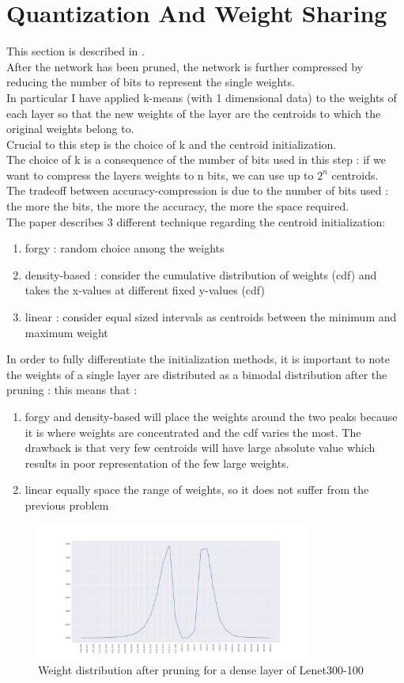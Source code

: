 \documentclass[journal]{vgtc}                %
\begin{document}
\section{Quantization And Weight Sharing}
This section is described in \cite{p2}.\\After the network has been pruned, the network is further compressed by reducing the number of bits to represent the single weights.\\In particular I have applied k-means (with 1 dimensional data) to the weights of each layer so that the new weights of the layer are the centroids to which the original weights belong to.\\Crucial to this step is the choice of k and the centroid initialization.\\The choice of k is a consequence of the number of bits used in this step : if we want to compress the layers weights to n bits, we can use up to $2^{n}$ centroids.\\The tradeoff between accuracy-compression is due to the number of bits used : the more the bits, the more the accuracy, the more the space required.\\The paper describes 3 different technique regarding the centroid initialization:
\begin{enumerate}
\item forgy : random choice among the weights 
\item density-based : consider the cumulative distribution of weights (cdf) and takes the x-values at different fixed y-values (cdf)
\item linear : consider equal sized intervals as centroids between the minimum and maximum weight
\end{enumerate}
In order to fully differentiate the initialization methods, it is important to note  the weights of a single layer are distributed as a bimodal distribution after the pruning : this means that :
\begin{enumerate}
\item forgy and density-based will place the weights around the two peaks because it is where weights are concentrated and the cdf varies the most. The drawback is that very few centroids will have large absolute value which results in poor representation of the few large weights.
\item linear equally space the range of weights, so it does not suffer from the previous problem
\end{enumerate}
\begin{figure}[H]
	\hspace*{-1cm}
	\includegraphics[width=90mm,scale=0.7]{weights-after-pruning}
	\caption{Weight distribution  after pruning for a dense layer of Lenet300-100 }
\end{figure}
\end{document}
